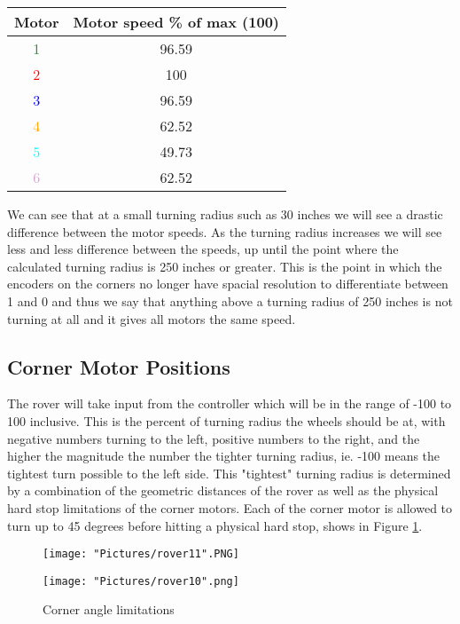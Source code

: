 \documentclass[12pt]{article}
\begin{document}
\begin{centering}	
	
\begin{tabular}[2]{|c|c|}

	\hline
	\textbf{Motor} & \textbf{Motor speed \% of max (100)} \\ \hline
	\textcolor{ForestGreen}{1} & 96.59 \\ \hline
	\textcolor{red}{2} & 100 \\ \hline
	\textcolor{blue}{3} & 96.59\\ \hline
	\textcolor{orange}{4} & 62.52 \\ \hline
	\textcolor{cyan}{5} & 49.73\\ \hline
	\textcolor{Plum}{6} & 62.52\\ \hline


\end{tabular}

\end{centering}
\bigskip 
\noindent We can see that at a small turning radius such as 30 inches we will see a drastic difference between the motor speeds. As the turning radius increases we will see less and less difference between the speeds, up until the point where the calculated turning radius is 250 inches or greater. This is the point in which the encoders on the corners no longer have spacial resolution to differentiate between 1 \degree and 0 \degree and thus we say that anything above a turning radius of 250 inches is not turning at all and it gives all motors the same speed. 

\subsection{Corner Motor Positions}

The rover will take input from the controller which will be in the range of -100 to 100 inclusive. This is the percent of turning radius the wheels should be at, with negative numbers turning to the left, positive numbers to the right, and the higher the magnitude the number the tighter turning radius, ie. -100 means the tightest turn possible to the left side. This "tightest" turning radius is determined by a combination of the geometric distances of the rover as well as the physical hard stop limitations of the corner motors. Each of the corner motor is allowed to turn up to 45 degrees before hitting a physical hard stop, shows in Figure \ref{r7}.

\begin{figure}[H]
 	\centering
  	\begin{minipage}[b]{0.45\textwidth}
		\texttt{[image: "Pictures/rover11".PNG]}
  	\end{minipage}
  	\hfill
  	\begin{minipage}[b]{0.45\textwidth}
    		\texttt{[image: "Pictures/rover10".png]}
  	\end{minipage}
  	\caption{Corner angle limitations}
	\label{r7}
\end{figure}
\end{document}
